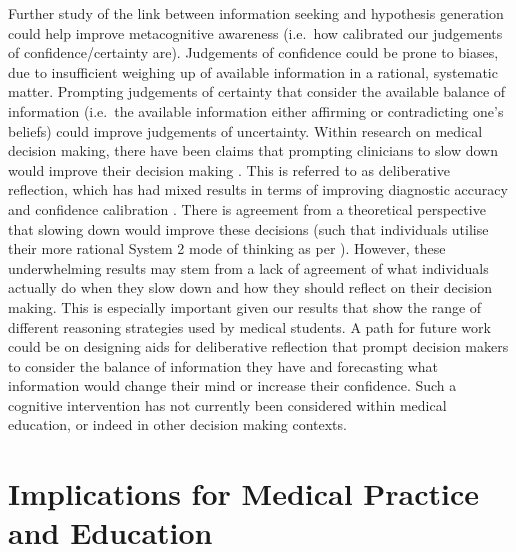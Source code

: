 \documentclass[a4paper, nobind]{templates/ociamthesis}
\begin{document}
Further study of the link between information seeking and hypothesis generation could help improve metacognitive awareness (i.e.~how calibrated our judgements of confidence/certainty are). Judgements of confidence could be prone to biases, due to insufficient weighing up of available information in a rational, systematic matter. Prompting judgements of certainty that consider the available balance of information (i.e.~the available information either affirming or contradicting one's beliefs) could improve judgements of uncertainty. Within research on medical decision making, there have been claims that prompting clinicians to slow down would improve their decision making \autocite{lambe_dual-process_2016}. This is referred to as deliberative reflection, which has had mixed results in terms of improving diagnostic accuracy and confidence calibration \autocite{mamede_effect_2010,lambe_guided_2018,costa_filho_effects_2019,kuhn_learning_2023}. There is agreement from a theoretical perspective that slowing down would improve these decisions (such that individuals utilise their more rational System 2 mode of thinking as per \autocite{kahneman_thinking_2011}). However, these underwhelming results may stem from a lack of agreement of what individuals actually do when they slow down and how they should reflect on their decision making. This is especially important given our results that show the range of different reasoning strategies used by medical students. A path for future work could be on designing aids for deliberative reflection that prompt decision makers to consider the balance of information they have and forecasting what information would change their mind or increase their confidence. Such a cognitive intervention has not currently been considered within medical education, or indeed in other decision making contexts.

\section{Implications for Medical Practice and Education}\label{implications-for-medical-practice-and-education}
\end{document}
